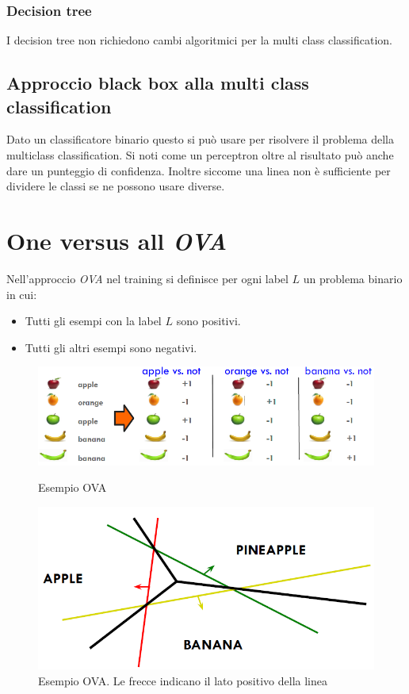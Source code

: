 		\subsubsection{Decision tree}
		I decision tree non richiedono cambi algoritmici per la multi class classification.
	
	\subsection{Approccio black box alla multi class classification}
	Dato un classificatore binario questo si pu\`o usare per risolvere il problema della multiclass classification.
	Si noti come un perceptron oltre al risultato pu\`o anche dare un punteggio di confidenza.
	Inoltre siccome una linea non \`e sufficiente per dividere le classi se ne possono usare diverse.

\section{One versus all \emph{OVA}}
Nell'approccio \emph{OVA} nel training si definisce per ogni label $L$ un problema binario in cui:
\begin{itemize}
	\item Tutti gli esempi con la label $L$ sono positivi.
	\item Tutti gli altri esempi sono negativi.
\end{itemize}


\begin{figure}
	\centering
	\begin{minipage}{.5\textwidth}
		\centering
		\includegraphics[width=1\linewidth]{imgs/chapter6/img0}
		\caption{Esempio OVA}
		\label{fig:chapter06-00}
	\end{minipage}%
	\begin{minipage}{.5\textwidth}
		\centering
		\includegraphics[width=0.8\linewidth]{imgs/chapter6/img1}
		\caption{Esempio OVA. Le frecce indicano il lato positivo della linea}
		\label{fig:chapter06-01}
	\end{minipage}
\end{figure}

